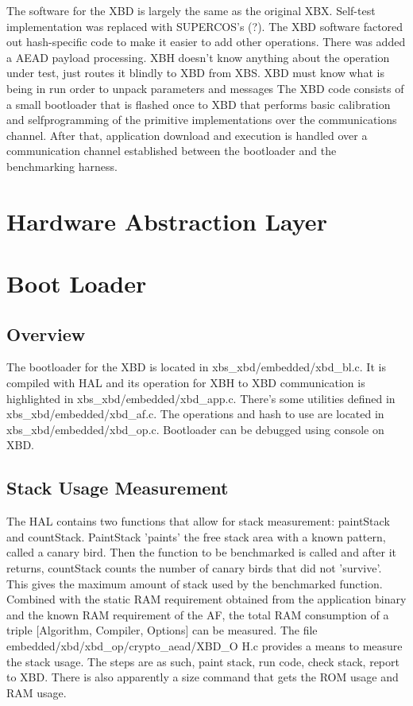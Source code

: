 \documentclass[twoside,11pt]{cergdoc}
\begin{document}



The software for the XBD is largely the same
as the original XBX. Self-test implementation was
replaced with SUPERCOS's (?). The XBD
software factored out hash-specific code to
make it easier to add other operations. There
was added a AEAD payload processing.
XBH doesn't know anything about the
operation under test, just routes it blindly to
XBD from XBS. XBD must know what is
being in run order to unpack
parameters and messages
The XBD code consists of a small
bootloader that is flashed once to XBD that
performs basic calibration and selfprogramming
of the primitive
implementations over the communications
channel. After that, application download
and execution is handled over a
communication channel established between
the bootloader and the benchmarking
harness.

\chapter{Hardware Abstraction Layer}
\chapter{Boot Loader}
  \section{Overview}
The bootloader for the XBD is
located in xbs\_xbd/embedded/xbd\_bl.c. It is
compiled with HAL and its operation for
XBH to XBD communication is highlighted
in xbs\_xbd/embedded/xbd\_app.c. There’s
some utilities defined in
xbs\_xbd/embedded/xbd\_af.c. The operations
and hash to use are located in
xbs\_xbd/embedded/xbd\_op.c. Bootloader
can be debugged using console on XBD.

  \section{Stack Usage Measurement}
The HAL contains two functions that
allow for stack measurement: paintStack and
countStack. PaintStack ’paints’ the free
stack area with a known pattern, called a
canary bird. Then the function to be
benchmarked is called and after it returns,
countStack counts the number of canary
birds that did not ’survive’. This gives the
maximum amount of stack used by the
benchmarked function. Combined with the
static RAM requirement obtained from the
application binary and the known RAM
requirement of the AF, the total RAM
consumption of a triple [Algorithm,
Compiler, Options] can be measured.
The file
embedded/xbd/xbd\_op/crypto\_aead/XBD\_O
H.c provides a means to measure the stack
usage. The steps are as such, paint stack, run
code, check stack, report to XBD. There is
also apparently a size command that gets the
ROM usage and RAM usage.
\end{document}
